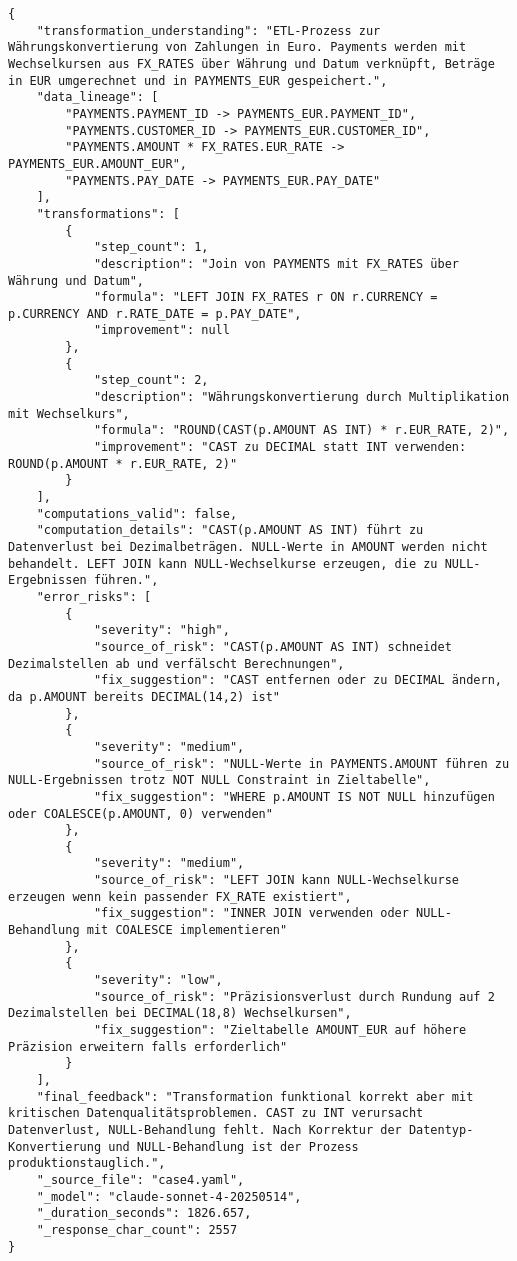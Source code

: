 \begin{lstlisting}[caption={Ausgabe: Claude Sonnet 4 Anwendungsfall 4 Konsistenzdurchlauf},label={claude_case4_prompt2}]
{
    "transformation_understanding": "ETL-Prozess zur Währungskonvertierung von Zahlungen in Euro. Payments werden mit Wechselkursen aus FX_RATES über Währung und Datum verknüpft, Beträge in EUR umgerechnet und in PAYMENTS_EUR gespeichert.",
    "data_lineage": [
        "PAYMENTS.PAYMENT_ID -> PAYMENTS_EUR.PAYMENT_ID",
        "PAYMENTS.CUSTOMER_ID -> PAYMENTS_EUR.CUSTOMER_ID",
        "PAYMENTS.AMOUNT * FX_RATES.EUR_RATE -> PAYMENTS_EUR.AMOUNT_EUR",
        "PAYMENTS.PAY_DATE -> PAYMENTS_EUR.PAY_DATE"
    ],
    "transformations": [
        {
            "step_count": 1,
            "description": "Join von PAYMENTS mit FX_RATES über Währung und Datum",
            "formula": "LEFT JOIN FX_RATES r ON r.CURRENCY = p.CURRENCY AND r.RATE_DATE = p.PAY_DATE",
            "improvement": null
        },
        {
            "step_count": 2,
            "description": "Währungskonvertierung durch Multiplikation mit Wechselkurs",
            "formula": "ROUND(CAST(p.AMOUNT AS INT) * r.EUR_RATE, 2)",
            "improvement": "CAST zu DECIMAL statt INT verwenden: ROUND(p.AMOUNT * r.EUR_RATE, 2)"
        }
    ],
    "computations_valid": false,
    "computation_details": "CAST(p.AMOUNT AS INT) führt zu Datenverlust bei Dezimalbeträgen. NULL-Werte in AMOUNT werden nicht behandelt. LEFT JOIN kann NULL-Wechselkurse erzeugen, die zu NULL-Ergebnissen führen.",
    "error_risks": [
        {
            "severity": "high",
            "source_of_risk": "CAST(p.AMOUNT AS INT) schneidet Dezimalstellen ab und verfälscht Berechnungen",
            "fix_suggestion": "CAST entfernen oder zu DECIMAL ändern, da p.AMOUNT bereits DECIMAL(14,2) ist"
        },
        {
            "severity": "medium",
            "source_of_risk": "NULL-Werte in PAYMENTS.AMOUNT führen zu NULL-Ergebnissen trotz NOT NULL Constraint in Zieltabelle",
            "fix_suggestion": "WHERE p.AMOUNT IS NOT NULL hinzufügen oder COALESCE(p.AMOUNT, 0) verwenden"
        },
        {
            "severity": "medium",
            "source_of_risk": "LEFT JOIN kann NULL-Wechselkurse erzeugen wenn kein passender FX_RATE existiert",
            "fix_suggestion": "INNER JOIN verwenden oder NULL-Behandlung mit COALESCE implementieren"
        },
        {
            "severity": "low",
            "source_of_risk": "Präzisionsverlust durch Rundung auf 2 Dezimalstellen bei DECIMAL(18,8) Wechselkursen",
            "fix_suggestion": "Zieltabelle AMOUNT_EUR auf höhere Präzision erweitern falls erforderlich"
        }
    ],
    "final_feedback": "Transformation funktional korrekt aber mit kritischen Datenqualitätsproblemen. CAST zu INT verursacht Datenverlust, NULL-Behandlung fehlt. Nach Korrektur der Datentyp-Konvertierung und NULL-Behandlung ist der Prozess produktionstauglich.",
    "_source_file": "case4.yaml",
    "_model": "claude-sonnet-4-20250514",
    "_duration_seconds": 1826.657,
    "_response_char_count": 2557
}
\end{lstlisting}

